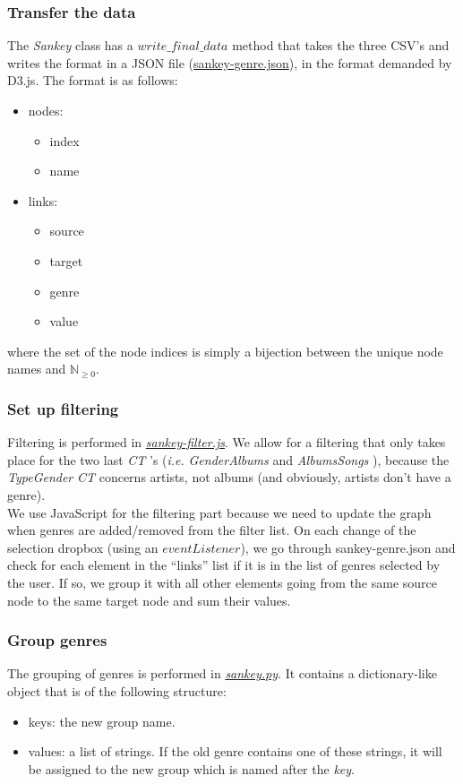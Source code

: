\documentclass[a4paper, 11pt, oneside]{article}
\newcommand{\N}{\mathbb{N}}
\newcommand{\ie}{\textit{i.e. }}
\newcommand{\tg}{\textit{TypeGender }}
\newcommand{\ga}{\textit{GenderAlbums }}
\newcommand{\as}{\textit{AlbumsSongs }}
\newcommand{\sk}{\textit{Sankey }}
\newcommand{\ct}{\textit{CT }}
\begin{document}
\subsubsection{Transfer the data}
The \sk class has a \(write\_final\_data\) method that takes the three CSV's and writes the format in a JSON file (\href{https://github.com/jorislimonier/collab-viz/blob/main/joris/sankey-genre.json}{sankey-genre.json}), in the format demanded by D3.js. The format is as follows:
\begin{itemize}
    \item nodes:
          \begin{itemize}
              \item index
              \item name
          \end{itemize}
    \item links:
          \begin{itemize}
              \item source
              \item target
              \item genre
              \item value
          \end{itemize}
\end{itemize}
where the set of the node indices is simply a bijection between the unique node names and \(\N_{\geq 0}\).

\subsubsection{Set up filtering}
Filtering is performed in \href{https://github.com/jorislimonier/collab-viz/blob/main/joris/sankey-filter.js}{\textit{sankey-filter.js}}. We allow for a filtering that only takes place for the two last \ct's (\ie \ga and \as), because the \tg \ct concerns artists, not albums (and obviously, artists don't have a genre). \\
We use JavaScript for the filtering part because we need to update the graph when genres are added/removed from the filter list. On each change of the selection dropbox (using an \(eventListener\)), we go through sankey-genre.json and check for each element in the ``links'' list if it is in the list of genres selected by the user. If so, we group it with all other elements going from the same source node to the same target node and sum their values.

\subsubsection{Group genres}
The grouping of genres is performed in \href{https://github.com/jorislimonier/collab-viz/blob/main/joris/src/sankey.py}{\textit{sankey.py}}. It contains a dictionary-like object that is of the following structure:
\begin{itemize}
    \item keys: the new group name.
    \item values: a list of strings. If the old genre contains one of these strings, it will be assigned to the new group which is named after the \textit{key}.
\end{itemize}
\end{document}
